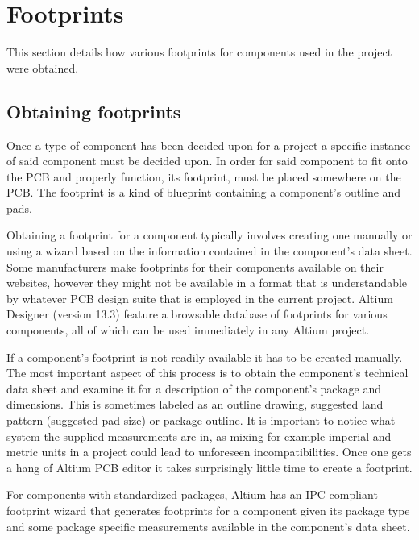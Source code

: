 \section{Footprints}
This section details how various footprints for components used in the project were obtained.

\subsection{Obtaining footprints}
Once a type of component has been decided upon for a project a specific instance of said component must be decided upon.
In order for said component to fit onto the PCB and properly function, its footprint, must be placed somewhere on the PCB.
The footprint is a kind of blueprint containing a component's outline and pads.

Obtaining a footprint for a component typically involves creating one manually or using a wizard based on the information contained in the component's data sheet.
Some manufacturers make footprints for their components available on their websites, however they might not be available in a format that is understandable by whatever PCB design suite that is employed in the current project.
Altium Designer (version 13.3) feature a browsable database of footprints for various components, all of which can be used immediately in any Altium project.

If a component's footprint is not readily available it has to be created manually.
The most important aspect of this process is to obtain the component's technical data sheet and examine it for a description of the component's package and dimensions.
This is sometimes labeled as an outline drawing, suggested land pattern (suggested pad size) or package outline.
It is important to notice what system the supplied measurements are in, as mixing for example imperial and metric units in a project could lead to unforeseen incompatibilities.
Once one gets a hang of Altium PCB editor it takes surprisingly little time to create a footprint.

For components with standardized packages, Altium has an IPC compliant footprint wizard that generates footprints for a component given its package type and some package specific measurements available in the component's data sheet.

